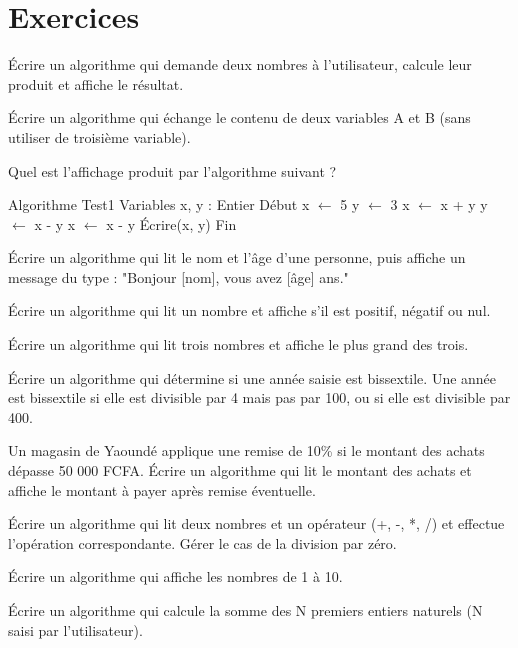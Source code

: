 \section{Exercices}


\exo{}
Écrire un algorithme qui demande deux nombres à l'utilisateur, calcule leur produit et affiche le résultat.

\exo{}
Écrire un algorithme qui échange le contenu de deux variables A et B (sans utiliser de troisième variable).

\exo{}
Quel est l'affichage produit par l'algorithme suivant ?
\begin{algo}
Algorithme Test1
Variables
    x, y : Entier
Début
    x $\leftarrow$ 5
    y $\leftarrow$ 3
    x $\leftarrow$ x + y
    y $\leftarrow$ x - y
    x $\leftarrow$ x - y
    Écrire(x, y)
Fin
\end{algo}

\exo{}
Écrire un algorithme qui lit le nom et l'âge d'une personne, puis affiche un message du type : "Bonjour [nom], vous avez [âge] ans."


\exo{}
Écrire un algorithme qui lit un nombre et affiche s'il est positif, négatif ou nul.

\exo{}
Écrire un algorithme qui lit trois nombres et affiche le plus grand des trois.

\exo{}
Écrire un algorithme qui détermine si une année saisie est bissextile. Une année est bissextile si elle est divisible par 4 mais pas par 100, ou si elle est divisible par 400.

\exo{}
Un magasin de Yaoundé applique une remise de 10\% si le montant des achats dépasse 50 000 FCFA. Écrire un algorithme qui lit le montant des achats et affiche le montant à payer après remise éventuelle.

\exo{}
Écrire un algorithme qui lit deux nombres et un opérateur (+, -, *, /) et effectue l'opération correspondante. Gérer le cas de la division par zéro.


\exo{}
Écrire un algorithme qui affiche les nombres de 1 à 10.

\exo{}
Écrire un algorithme qui calcule la somme des N premiers entiers naturels (N saisi par l'utilisateur).

